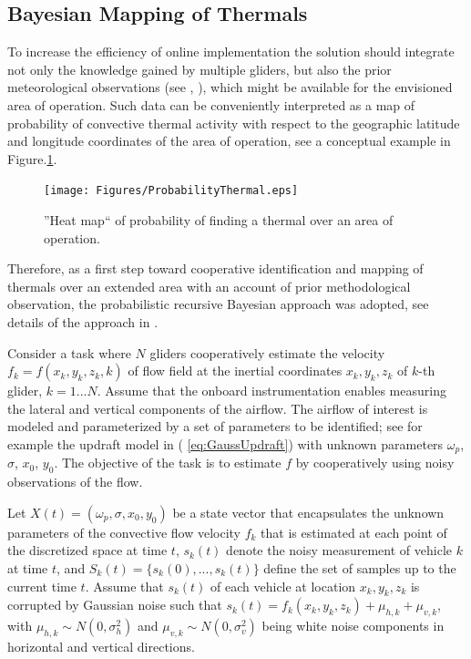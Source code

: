 \documentclass{ifacconf}
\begin{document}
\subsection{Bayesian Mapping of Thermals}
\label{subsec:BayesianMapping}
To increase the efficiency of online implementation the solution should integrate not only the
knowledge gained by multiple gliders, but also the prior meteorological observations
(see \cite{Pennycuick:1998}, \cite{Hindman:2007}), which might be available for the
envisioned area of operation. Such data can be conveniently interpreted as a map of probability
of convective thermal activity with respect to the geographic latitude and longitude coordinates
of the area of operation, see a conceptual example in Figure.\ref{fig:HeatMap}.
\begin{figure}[thpb]
  \centering
  \texttt{[image: Figures/ProbabilityThermal.eps]}
  \caption{''Heat map`` of probability of finding a thermal over an area of operation.}
  \label{fig:HeatMap}
\end{figure}

Therefore, as a first step toward cooperative identification and mapping of thermals over an extended area with an account of prior methodological observation, the probabilistic recursive Bayesian approach was adopted, see details of the approach in \cite{Bergman:1999}.

Consider a task where $N$ gliders cooperatively estimate the velocity $f_k=f(x_k,y_k,z_k,k)$ of flow field  at  the inertial coordinates $x_k,y_k,z_k$  of $k$-th glider, $k=1...N$. Assume that the onboard instrumentation enables measuring the lateral and vertical components of the airflow. The airflow of interest is modeled and parameterized by a set of parameters to be identified;  see for example the updraft model in ( \ref{eq:GaussUpdraft}) with unknown parameters $\omega_p$, $\sigma$, $x_0$, $y_0$. The objective of the task is to estimate $f$ by cooperatively using noisy observations of the flow.

Let $X(t)=(\omega_p, \sigma, x_0, y_0)$ be a state vector that encapsulates the unknown parameters of the convective flow velocity $f_k$ that is estimated at each point of the discretized space at time $t$, $s_k(t)$ denote the noisy measurement of vehicle $k$ at time $t$, and $S_k(t)=\{s_k(0),...,s_k(t)\}$ define the set of samples up to the current time $t$. Assume that $s_k(t)$ of each vehicle at location $x_k,y_k,z_k$ is corrupted by Gaussian noise such that $s_k(t)=f_k(x_k,y_k,z_k)+\mu_{h,k}+\mu_{v,k}$, with $\mu_{h,k}\sim N(0,\sigma^2_h)$ and $\mu_{v,k}\sim N(0,\sigma^2_v)$ being white noise components in horizontal and vertical directions.
\end{document}

